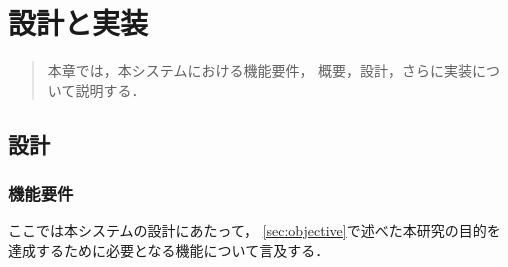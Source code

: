 \chapter{設計と実装}
\begin{large}
\begin{quote}
本章では，本システムにおける機能要件，
概要，設計，さらに実装について説明する．
\end{quote}
\end{large}
\clearpage


\section{設計}

\subsection{機能要件}
ここでは本システムの設計にあたって，
\ref{sec:objective}で述べた本研究の目的を
達成するために必要となる機能について言及する．


